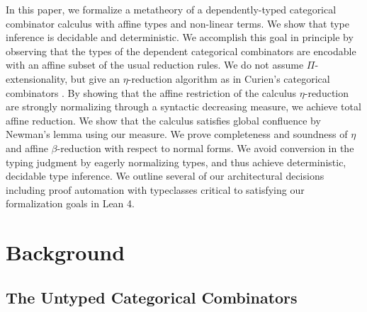 \documentclass{article}
\begin{document}
In this paper, we formalize a metatheory of a dependently-typed categorical combinator calculus with affine types and non-linear terms. We show that type inference is decidable and deterministic. We accomplish this goal in principle by observing that the types of the dependent categorical combinators are encodable with an affine subset of the usual reduction rules. We do not assume \(\Pi\)-extensionality, but give an \(\eta\)-reduction algorithm as in Curien's categorical combinators \autocite[p. 221]{CURIEN1986188}. By showing that the affine restriction of the calculus \(\eta\)-reduction are strongly normalizing through a syntactic decreasing measure, we achieve total affine reduction. We show that the calculus satisfies global confluence by Newman's lemma \autocite{newman1942theories} using our measure. We prove completeness and soundness of \(\eta\) and affine \(\beta\)-reduction with respect to normal forms. We avoid conversion in the typing judgment by eagerly normalizing types, and thus achieve deterministic, decidable type inference. We outline several of our architectural decisions including proof automation with typeclasses critical to satisfying our formalization goals in Lean 4.


\section{Background}

\subsection{The Untyped Categorical Combinators}
\end{document}
